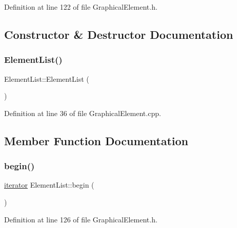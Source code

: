 Definition at line 122 of file Graphical\+Element.\+h.



\subsection{Constructor \& Destructor Documentation}
\mbox{\label{class_element_list_ae2d7329bdbfaf1f8dcb864776ee6de9b}} 
\subsubsection{\texorpdfstring{Element\+List()}{ElementList()}}
{\footnotesize\ttfamily Element\+List\+::\+Element\+List (\begin{DoxyParamCaption}{ }\end{DoxyParamCaption})}



Definition at line 36 of file Graphical\+Element.\+cpp.



\subsection{Member Function Documentation}
\mbox{\label{class_element_list_abd034ccb887a4cccedb6906e2b516a99}} 
\subsubsection{\texorpdfstring{begin()}{begin()}}
{\footnotesize\ttfamily \hyperlink{class_element_list_a10e1b0c17ebe441fcd035fcf0a00d25e}{iterator} Element\+List\+::begin (\begin{DoxyParamCaption}{ }\end{DoxyParamCaption})\hspace{0.3cm}{\ttfamily [inline]}}



Definition at line 126 of file Graphical\+Element.\+h.

\mbox{\label{class_element_list_a11b3b63aad29b085b5d77e2e623d6bb4}} 
